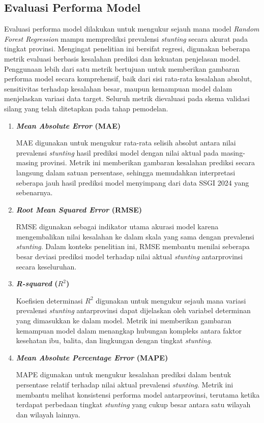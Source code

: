 \subsection{Evaluasi Performa Model} \label{subsec:evaluasi}
Evaluasi performa model dilakukan untuk mengukur sejauh mana model \textit{Random Forest Regression} mampu memprediksi prevalensi \textit{stunting} secara akurat pada tingkat provinsi. Mengingat penelitian ini bersifat regresi, digunakan beberapa metrik evaluasi berbasis kesalahan prediksi dan kekuatan penjelasan model. Penggunaan lebih dari satu metrik bertujuan untuk memberikan gambaran performa model secara komprehensif, baik dari sisi rata-rata kesalahan absolut, sensitivitas terhadap kesalahan besar, maupun kemampuan model dalam menjelaskan variasi data target. Seluruh metrik dievaluasi pada skema validasi silang yang telah ditetapkan pada tahap pemodelan.

\begin{enumerate}
    \item \textbf{\textit{Mean Absolute Error} (MAE)}  
    
    MAE digunakan untuk mengukur rata-rata selisih absolut antara nilai prevalensi \textit{stunting} hasil prediksi model dengan nilai aktual pada masing-masing provinsi. Metrik ini memberikan gambaran kesalahan prediksi secara langsung dalam satuan persentase, sehingga memudahkan interpretasi seberapa jauh hasil prediksi model menyimpang dari data SSGI 2024 yang sebenarnya.

    \item \textbf{\textit{Root Mean Squared Error} (RMSE)}  
    
    RMSE digunakan sebagai indikator utama akurasi model karena mengembalikan nilai kesalahan ke dalam skala yang sama dengan prevalensi \textit{stunting}. Dalam konteks penelitian ini, RMSE membantu menilai seberapa besar deviasi prediksi model terhadap nilai aktual \textit{stunting} antarprovinsi secara keseluruhan.

    \item \textbf{\textit{R-squared} ($R^2$)}  
    
    Koefisien determinasi $R^2$ digunakan untuk mengukur sejauh mana variasi prevalensi \textit{stunting} antarprovinsi dapat dijelaskan oleh variabel determinan yang dimasukkan ke dalam model. Metrik ini memberikan gambaran kemampuan model dalam menangkap hubungan kompleks antara faktor kesehatan ibu, balita, dan lingkungan dengan tingkat \textit{stunting}.

    \item \textbf{\textit{Mean Absolute Percentage Error} (MAPE)}  
    
    MAPE digunakan untuk mengukur kesalahan prediksi dalam bentuk persentase relatif terhadap nilai aktual prevalensi \textit{stunting}. Metrik ini membantu melihat konsistensi performa model antarprovinsi, terutama ketika terdapat perbedaan tingkat \textit{stunting} yang cukup besar antara satu wilayah dan wilayah lainnya.
\end{enumerate}

